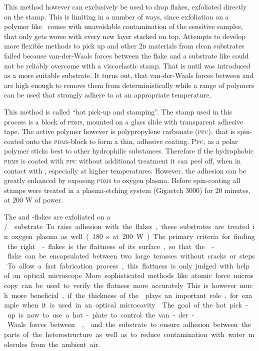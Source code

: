 This method however can exclusively be used to drop \tmdg flakes, exfoliated directly on the stamp. This is limiting in a number of ways, since exfoliation on a polymer like \pdms\ comes with unavoidable contamination of the sensitive samples, that only gets worse with every new layer stacked on top. Attempts to develop more flexible methods to pick up \tmds and other 2\textsc{d} materials from clean substrates failed because van-der-Waals forces between the flake and a substrate like \sio could not be reliably overcome with a viscoelastic stamp. That is until \hbng was introduced as a more suitable substrate. It turns out, that van-der-Waals forces between \hbng and \tmds are high enough to remove them from \sio deterministically while a range of polymers can be used that strongly adhere to \hbng at an appropriate temperature.

This method is called ``hot pick-up and stamping''\cite{pizzocchero_hot_2016, tien_study_2016}. The stamp used in this process is a block of \textsc{pdms}, mounted on a glass slide with transparent adhesive tape. The active polymer however is polypropylene carbonate (\textsc{ppc}), that is spin-coated onto the \textsc{pdms}-block to form a thin, adhesive coating. \textsc{Ppc}, as a polar polymer sticks best to other hydrophilic substances. Therefore if the hydrophobic \textsc{pdms} is coated with \textsc{ppc} without additional treatment it can peel off, when in contact with \sio\!, especially at higher temperatures. However, the adhesion can be greatly enhanced by exposing \textsc{pdms} to oxygen plasma\cite{jung_adhesion_2016}. Before spin-coating all stamps were treated in a plasma-etching system (Gigaetch 3000) for 20 minutes, at 200 W of power.

The \tmdg and \hbn-flakes are exfoliated on a \si/\sio substrate. To raise adhesion with the flakes, these substrates are treated in oxygen plasma as well (180 s at 200 W). The primary criteria for finding the right \hbn-flakes is the flattness of its surface, so that the \tmd-flake can be encapsulated between two large terasses without cracks or steps. To allow a fast fabrication process, this flattness is only judged with help of an optical microscope. More sophisticated methods like atomic force microscopy can be used to verify the flatness more accurately. This is however much more beneficial, if the thickness of the \hbng plays an important role, for example when it is used in an optical microcavity \cite{sidler_fermi_2016}.

The goal of the hot pick-up is now to use a hot-plate to control the van-der-Waals forces between \hbn, \tmds and the substrate to ensure adhesion between the parts of the heterostructure as well as to reduce contamination with water molecules from the ambient air.

